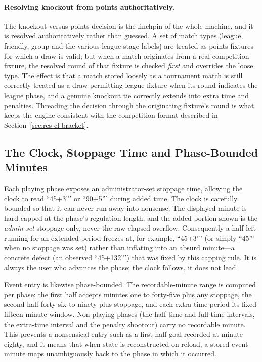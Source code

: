 \paragraph{Resolving knockout from points authoritatively.} The knockout-versus-points decision is
the linchpin of the whole machine, and it is resolved authoritatively rather than guessed. A set of
match types (league, friendly, group and the various league-stage labels) are treated as
points fixtures for which a draw is valid; but when a match originates from a real competition fixture,
the resolved round of that fixture is checked \emph{first} and overrides the loose type. The effect is
that a match stored loosely as a tournament match is still correctly treated as a draw-permitting league
fixture when its round indicates the league phase, and a genuine knockout tie correctly extends into
extra time and penalties. Threading the decision through the originating fixture's round is what keeps
the engine consistent with the competition format described in
Section~\ref{sec:res-cl-bracket}.

\subsection{The Clock, Stoppage Time and Phase-Bounded Minutes}
Each playing phase exposes an administrator-set stoppage time, allowing the clock to read ``45+3''' or
``90+5''' during added time. The clock is carefully bounded so that it can never run away into nonsense.
The displayed minute is hard-capped at the phase's regulation length, and the added portion shown is the
\emph{admin-set} stoppage only, never the raw elapsed overflow. Consequently a half left running for an
extended period freezes at, for example, ``45+3''' (or simply ``45''' when no stoppage was set) rather
than inflating into an absurd minute---a concrete defect (an observed ``45+132''') that was fixed by this
capping rule. It is always the user who advances the phase; the clock follows, it does not lead.

Event entry is likewise phase-bounded. The recordable-minute range is computed per phase: the first half
accepts minutes one to forty-five plus any stoppage, the second half forty-six to ninety plus stoppage,
and each extra-time period its fixed fifteen-minute window. Non-playing phases (the half-time and full-time
intervals, the extra-time interval and the penalty shootout) carry no recordable minute. This prevents a
nonsensical entry such as a first-half goal recorded at minute eighty, and it means that when state is
reconstructed on reload, a stored event minute maps unambiguously back to the phase in which it occurred.

